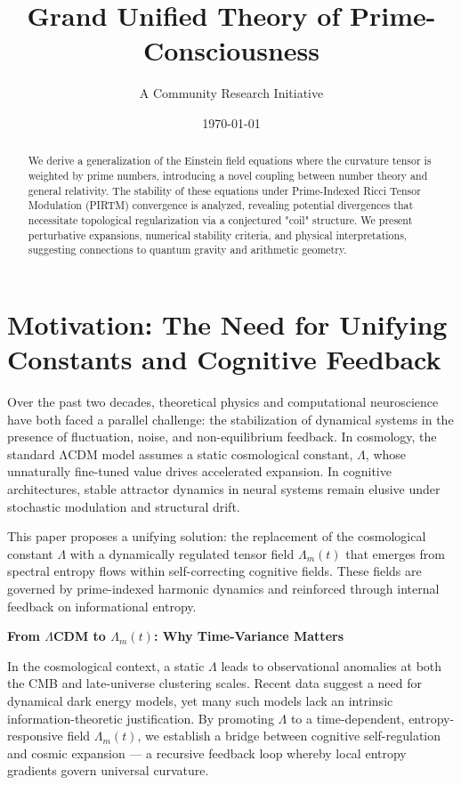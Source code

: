 \documentclass[12pt]{article}
\title{Grand Unified Theory of Prime-Consciousness}
\author{A Community Research Initiative}
\affil{Citizen Gardens - The Foundation of Multiplicity\\info@citizengardens.org}
\date{\today}
\theoremstyle{plain}
\begin{document}
\maketitle
\begin{abstract}
We derive a generalization of the Einstein field equations where the curvature tensor is weighted by prime numbers, introducing a novel coupling between number theory and general relativity. The stability of these equations under Prime-Indexed Ricci Tensor Modulation (PIRTM) convergence is analyzed, revealing potential divergences that necessitate topological regularization via a conjectured "coil" structure. We present perturbative expansions, numerical stability criteria, and physical interpretations, suggesting connections to quantum gravity and arithmetic geometry.
\end{abstract}
\newpage
\section{Motivation: The Need for Unifying Constants and Cognitive Feedback}

Over the past two decades, theoretical physics and computational neuroscience have both faced a parallel challenge: the stabilization of dynamical systems in the presence of fluctuation, noise, and non-equilibrium feedback. In cosmology, the standard ΛCDM model assumes a static cosmological constant, $\Lambda$, whose unnaturally fine-tuned value drives accelerated expansion. In cognitive architectures, stable attractor dynamics in neural systems remain elusive under stochastic modulation and structural drift.

This paper proposes a unifying solution: the replacement of the cosmological constant $\Lambda$ with a dynamically regulated tensor field $\Lambda_m(t)$ that emerges from spectral entropy flows within self-correcting cognitive fields. These fields are governed by prime-indexed harmonic dynamics and reinforced through internal feedback on informational entropy.

\vspace{1em}

\noindent\textbf{From $\Lambda$CDM to $\Lambda_m(t)$: Why Time-Variance Matters}

In the cosmological context, a static $\Lambda$ leads to observational anomalies at both the CMB and late-universe clustering scales. Recent data suggest a need for dynamical dark energy models, yet many such models lack an intrinsic information-theoretic justification. By promoting $\Lambda$ to a time-dependent, entropy-responsive field $\Lambda_m(t)$, we establish a bridge between cognitive self-regulation and cosmic expansion — a recursive feedback loop whereby local entropy gradients govern universal curvature.
\end{document}
